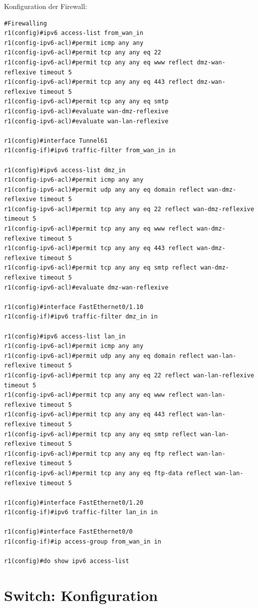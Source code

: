 Konfiguration der Firewall:
\begin{lstlisting}[numbers=none]
#Firewalling
r1(config)#ipv6 access-list from_wan_in
r1(config-ipv6-acl)#permit icmp any any
r1(config-ipv6-acl)#permit tcp any any eq 22
r1(config-ipv6-acl)#permit tcp any any eq www reflect dmz-wan-reflexive timeout 5
r1(config-ipv6-acl)#permit tcp any any eq 443 reflect dmz-wan-reflexive timeout 5
r1(config-ipv6-acl)#permit tcp any any eq smtp
r1(config-ipv6-acl)#evaluate wan-dmz-reflexive
r1(config-ipv6-acl)#evaluate wan-lan-reflexive

r1(config)#interface Tunnel61
r1(config-if)#ipv6 traffic-filter from_wan_in in

r1(config)#ipv6 access-list dmz_in
r1(config-ipv6-acl)#permit icmp any any
r1(config-ipv6-acl)#permit udp any any eq domain reflect wan-dmz-reflexive timeout 5
r1(config-ipv6-acl)#permit tcp any any eq 22 reflect wan-dmz-reflexive timeout 5
r1(config-ipv6-acl)#permit tcp any any eq www reflect wan-dmz-reflexive timeout 5
r1(config-ipv6-acl)#permit tcp any any eq 443 reflect wan-dmz-reflexive timeout 5
r1(config-ipv6-acl)#permit tcp any any eq smtp reflect wan-dmz-reflexive timeout 5
r1(config-ipv6-acl)#evaluate dmz-wan-reflexive

r1(config)#interface FastEthernet0/1.10
r1(config-if)#ipv6 traffic-filter dmz_in in

r1(config)#ipv6 access-list lan_in
r1(config-ipv6-acl)#permit icmp any any
r1(config-ipv6-acl)#permit udp any any eq domain reflect wan-lan-reflexive timeout 5
r1(config-ipv6-acl)#permit tcp any any eq 22 reflect wan-lan-reflexive timeout 5
r1(config-ipv6-acl)#permit tcp any any eq www reflect wan-lan-reflexive timeout 5
r1(config-ipv6-acl)#permit tcp any any eq 443 reflect wan-lan-reflexive timeout 5
r1(config-ipv6-acl)#permit tcp any any eq smtp reflect wan-lan-reflexive timeout 5
r1(config-ipv6-acl)#permit tcp any any eq ftp reflect wan-lan-reflexive timeout 5
r1(config-ipv6-acl)#permit tcp any any eq ftp-data reflect wan-lan-reflexive timeout 5

r1(config)#interface FastEthernet0/1.20
r1(config-if)#ipv6 traffic-filter lan_in in

r1(config)#interface FastEthernet0/0
r1(config-if)#ip access-group from_wan_in in

r1(config)#do show ipv6 access-list
\end{lstlisting}\newpage
\section{Switch: Konfiguration}


